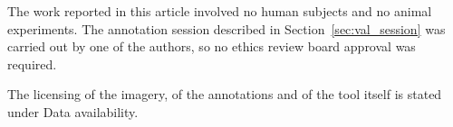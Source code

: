 
The work reported in this article involved no human subjects and
no animal experiments. The annotation session described in
Section~\ref{sec:val_session} was carried out by one of the
authors, so no ethics review board approval was required.

The licensing of the imagery, of the annotations and of the tool
itself is stated under Data availability.
